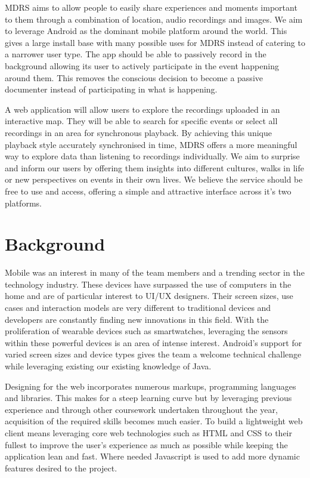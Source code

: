 \documentclass{l3proj}
\begin{document}
MDRS aims to allow people to easily share experiences and moments important to them through a combination of location, audio recordings and images. We aim to leverage Android as the dominant mobile platform around the world. This gives a large install base with many possible uses for MDRS instead of catering to a narrower user type. The app should be able to passively record in the background allowing its user to actively participate in the event happening around them. This removes the conscious decision to become a passive documenter instead of participating in what is happening.

A web application will allow users to explore the recordings uploaded in an interactive map. They will be able to search for specific events or select all recordings in an area for synchronous playback. By achieving this unique playback style accurately synchronised in time, MDRS offers a more meaningful way to explore data than listening to recordings individually. We aim to surprise and inform our users by offering them insights into different cultures, walks in life or new perspectives on events in their own lives. We believe the service should be free to use and access, offering a simple and attractive interface across it's two platforms.

\section{Background}
Mobile was an interest in many of the team members and a trending sector in the technology industry. These devices have surpassed the use of computers in the home and are of particular interest to UI/UX designers. Their screen sizes, use cases and interaction models are very different to traditional devices and developers are constantly finding new innovations in this field. With the proliferation of wearable devices such as smartwatches, leveraging the sensors within these powerful devices is an area of intense interest. Android’s support for varied screen sizes and device types gives the team a welcome technical challenge while leveraging existing our existing knowledge of Java.

Designing for the web incorporates numerous markups, programming languages and libraries. This makes for a steep learning curve but by leveraging previous experience and through other coursework undertaken throughout the year, acquisition of the required skills becomes much easier. To build a lightweight web client means leveraging core web technologies such as HTML and CSS to their fullest to improve the user’s experience as much as possible while keeping the application lean and fast. Where needed Javascript is used to add more dynamic features desired to the project.
\end{document}
